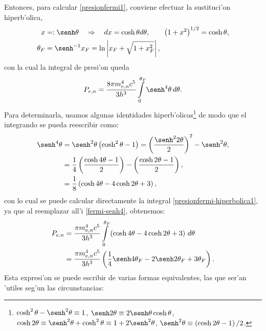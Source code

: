 Entonces, para calcular \eqref{presionfermi1}, conviene efectuar la sustituci'on hiperb'olica,
\begin{align}\label{sust-hiperbolica}
 x&=:\senh\theta\quad\Rightarrow\quad dx=\cosh\theta d\theta,\qquad \left(1+x^2\right)^{1/2}=\cosh\theta,\\
\theta_F&=\senh^{-1}x_F=\ln\left|x_F+\sqrt{1+x_F^2}\right|,
\end{align}
con la cual la integral de presi'on queda
\begin{align}\label{presionfermi-hiperbolica1}
 P_{e,n}=\frac{8\pi m_{e,n}^4c^5}{3h^3}\int\limits_0^{\theta_F}\senh^4\theta\, d\theta.
\end{align}
Para determinarla, usamos algunas identidades hiperb'olicas\footnote{$\cosh^2\theta-\senh^2\theta\equiv 1$, $\senh2\theta\equiv 2\senh\theta\cosh\theta$, $\cosh2\theta\equiv \senh^2\theta+\cosh^2\theta\equiv 1+2\senh^2\theta$, $\senh^2\theta\equiv \left(\cosh2\theta-1\right)/2$.} de modo que el integrando se pueda reescribir como:
\begin{align}
 \senh^4\theta&=\senh^2\theta\left(\cosh^2\theta-1\right)=\left(\frac{\senh^2 2\theta}{2}\right)^2-\senh^2\theta,\\
&=\frac{1}{4}\left(\frac{\cosh4\theta-1}{2}\right)-\left(\frac{\cosh2\theta-1}{2}\right),\\
&=\frac{1}{8}\left(\cosh4\theta-4\cosh2\theta+3\right)\label{fermi-senh4},
\end{align}
con lo cual se puede calcular directamente la integral \eqref{presionfermi-hiperbolica1}, ya que al reemplazar all'i \eqref{fermi-senh4}, obtenemos:
\begin{align}
 P_{e,n}&=\frac{\pi m_{e,n}^4c^5}{3h^3}\int\limits_0^{\theta_F}\left(\cosh4\theta-4\cosh2\theta+3\right)\, d\theta\\
&=\frac{\pi m_{e,n}^4c^5}{3h^3}\left(\frac{1}{4}\senh4\theta_F-2\senh2\theta_F+3\theta_F\right) .\label{presionfermi-hiperbolica2}
\end{align}
Esta expresi'on se puede escribir de varias formas equivalentes, las que ser'an 'utiles seg'un las circunstancias:
